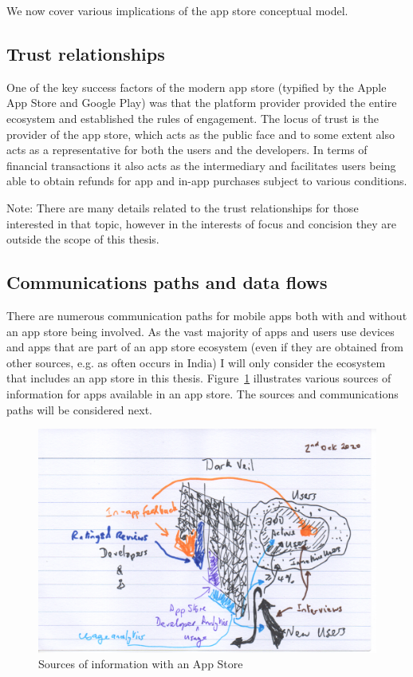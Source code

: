 We now cover various implications of the app store conceptual model.

\subsection{Trust relationships}
One of the key success factors of the modern app store (typified by the Apple App Store and Google Play) was that the platform provider provided the entire ecosystem and established the rules of engagement. The locus of trust is the provider of the app store, which acts as the public face and to some extent also acts as a representative for both the users and the developers. In terms of financial transactions it also acts as the intermediary and facilitates users being able to obtain refunds for app and in-app purchases subject to various conditions. 

Note: There are many details related to the trust relationships for those interested in that topic, however in the interests of focus and concision they are outside the scope of this thesis. 

\subsection{Communications paths and data flows}
There are numerous communication paths for mobile apps both with and without an app store being involved. As the vast majority of apps and users use devices and apps that are part of an app store ecosystem (even if they are obtained from other sources, e.g. as often occurs in India) I will only consider the ecosystem that includes an app store in this thesis. Figure~\ref{fig:sources-of-info-with-app-store-background-ch} illustrates various sources of information for apps available in an app store. The sources and communications paths will be considered next. 

\begin{figure}[ht]
    \centering
    \includegraphics[width=13cm]{images/rough-sketches/sources-of-information-with-app-store-1.png}
    \caption{Sources of information with an App Store}
    \label{fig:sources-of-info-with-app-store-background-ch}
\end{figure}

